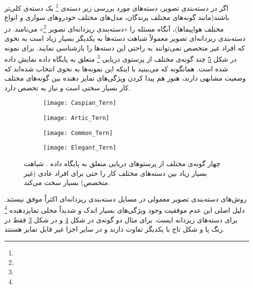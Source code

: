 \documentclass[11pt]{article}
\begin{document}
اگر در دسته‌بندی تصویر، دسته‌های مورد بررسی زیر دسته‌ی
\footnote{}
یک دسته‌ی کلی‌تر باشند(مانند گونه‌های مختلف پرندگان، مدل‌های مختلف خودروهای سواری و انواع مختلف هواپیماها)، آنگاه مسئله را «دسته‌بندی ریزدانه‌ای تصویر
\footnote{}»
می‌نامند. در دسته‌بندی ریزدانه‌ای تصویر معمولاً شباهت دسته‌ها به یکدیگر بسیار زیاد است به نحوی که افراد غیر متخصص نمی‌توانند به راحتی این دسته‌ها را بازشناسی نمایند. برای نمونه در شکل
\ref{fig:intro:terns}
چند گونه‌ی مختلف از پرستوی دریایی
\footnote{}
متعلق به پایگاه داده
 \cite{cub2002011}
نمایش داده شده است. همانگونه که می‌بینید با اینکه این نمونه‌ها به نحوی انتخاب شده‌اند که وضعیت مشابهی دارند، هنوز هم پیدا کردن ویژگی‌های تمایز دهنده بین گونه‌های مختلف کار بسیار سختی است و نیاز به تخصص دارد.

\begin{figure}[h]
	\centering
	\begin{subfigure}[h]{0.23\textwidth}
		\texttt{[image: Caspian\_Tern]}
		\caption{}
		\label{fig:intro:terns:1}
	\end{subfigure} 
	\begin{subfigure}[h]{0.23\textwidth}
		\texttt{[image: Artic\_Tern]}
		\caption{}
		\label{fig:intro:terns:2}
	\end{subfigure}
	\begin{subfigure}[h]{0.23\textwidth}
		\texttt{[image: Common\_Tern]}
		\caption{}
		\label{fig:intro:terns:3}
	\end{subfigure}
	\begin{subfigure}[h]{0.23\textwidth}
		\texttt{[image: Elegant\_Tern]}
		\caption{}
		\label{fig:intro:terns:4}
	\end{subfigure}
	\caption{چهار گونه‌ی مختلف از پرستوهای دریایی متعلق به پایگاه داده
 \cite{cub2002011}.
شباهت بسیار زیاد بین دسته‌های مختلف کار را حتی برای افراد عادی (غیر متخصص) بسیار سخت می‌کند.
}
	\label{fig:intro:terns}
\end{figure}

روش‌های دسته‌بندی تصویر معمولی در مسايل دسته‌بندی ریزدانه‌ای اکثراً موفق نیستند. دلیل اصلی این عدم موفقیت وجود ویژگی‌های بسیار اندک و شدیداً محلی تمایزدهنده
\footnote{}
برای دسته‌های ریزدانه ایست. برای مثال دو گونه‌ی
 در شکل \ref{fig:intro:terns:4}
و
 در شکل \ref{fig:intro:terns:3}
فقط در رنگ پا و شکل تاج با یکدیگر تفاوت دارند و در سایر اجزا غیر قابل تمایز هستند. 
\end{document}
